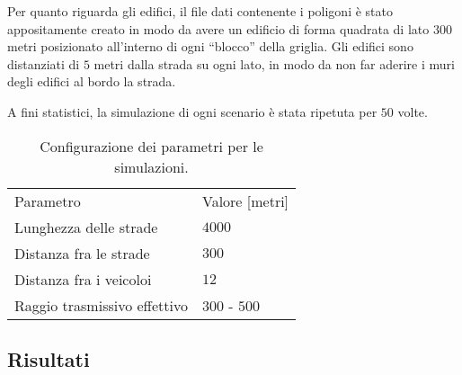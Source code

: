 Per quanto riguarda gli edifici, il file dati contenente i poligoni è stato appositamente creato in modo da avere un edificio di forma quadrata di lato $300$ metri
posizionato all'interno di ogni ``blocco'' della griglia.
Gli edifici sono distanziati di $5$ metri dalla strada su ogni lato, in modo da non far aderire i muri degli edifici al bordo la strada.

A fini statistici, la simulazione di ogni scenario è stata ripetuta per $50$ volte.
%
\begin{table}
	\centering
	\begin{tabular}{| m{.4\linewidth} | p{.2\linewidth} |}
		\toprule
		Parametro											&			Valore [metri]			\\
		\thickerline
		Lunghezza delle strade				&			$4000$							\\
		Distanza fra le strade				&			$300$								\\
		Distanza fra i veicoloi 			&			$12$ 								\\
		Raggio trasmissivo effettivo	&			$300$ - $500$				\\
		\bottomrule
	\end{tabular}
	\caption{Configurazione dei parametri per le simulazioni.\label{tab:parametri-simulazioni-barichello}}
\end{table}
%
%
\subsection{Risultati}\label{sec:configurazione-griglia-risultati}
